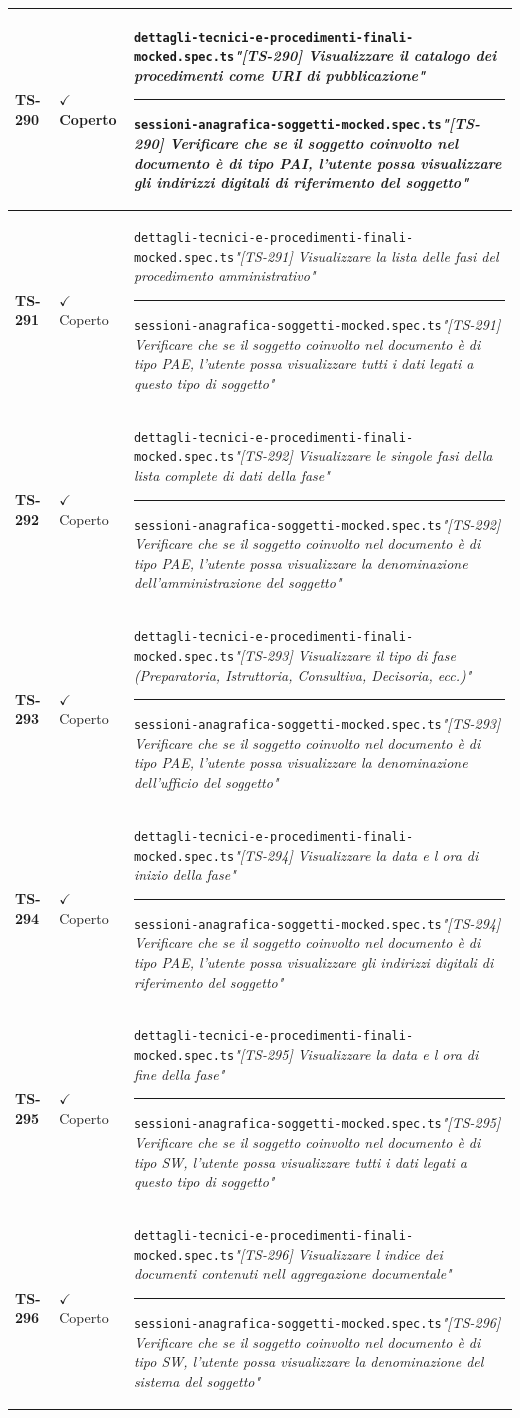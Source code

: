\documentclass[a4paper,12pt]{article}
\newcommand{\ok}{\textcolor{green!60!black}{$\checkmark$ Coperto}}
\newcommand{\f}[1]{\nolinkurl{#1}\newline}
\newcommand{\q}[1]{\textit{#1}}
\newcommand{\sep}{\newline \vspace{2mm} \hrule \vspace{2mm}}
\begin{document}
\begin{longtable}{|p{1.5cm}|p{3.0cm}|p{10.5cm}|}
\textbf{TS-290} & \ok & \f{dettagli-tecnici-e-procedimenti-finali-mocked.spec.ts}\q{"[TS-290] Visualizzare il catalogo dei procedimenti come URI di pubblicazione"} \sep \f{sessioni-anagrafica-soggetti-mocked.spec.ts}\q{"[TS-290] Verificare che se il soggetto coinvolto nel documento è di tipo PAI, l'utente possa visualizzare gli indirizzi digitali di riferimento del soggetto"} \\ \hline
\textbf{TS-291} & \ok & \f{dettagli-tecnici-e-procedimenti-finali-mocked.spec.ts}\q{"[TS-291] Visualizzare la lista delle fasi del procedimento amministrativo"} \sep \f{sessioni-anagrafica-soggetti-mocked.spec.ts}\q{"[TS-291] Verificare che se il soggetto coinvolto nel documento è di tipo PAE, l'utente possa visualizzare tutti i dati legati a questo tipo di soggetto"} \\ \hline
\textbf{TS-292} & \ok & \f{dettagli-tecnici-e-procedimenti-finali-mocked.spec.ts}\q{"[TS-292] Visualizzare le singole fasi della lista complete di dati della fase"} \sep \f{sessioni-anagrafica-soggetti-mocked.spec.ts}\q{"[TS-292] Verificare che se il soggetto coinvolto nel documento è di tipo PAE, l'utente possa visualizzare la denominazione dell'amministrazione del soggetto"} \\ \hline
\textbf{TS-293} & \ok & \f{dettagli-tecnici-e-procedimenti-finali-mocked.spec.ts}\q{"[TS-293] Visualizzare il tipo di fase (Preparatoria, Istruttoria, Consultiva, Decisoria, ecc.)"} \sep \f{sessioni-anagrafica-soggetti-mocked.spec.ts}\q{"[TS-293] Verificare che se il soggetto coinvolto nel documento è di tipo PAE, l'utente possa visualizzare la denominazione dell'ufficio del soggetto"} \\ \hline
\textbf{TS-294} & \ok & \f{dettagli-tecnici-e-procedimenti-finali-mocked.spec.ts}\q{"[TS-294] Visualizzare la data e l ora di inizio della fase"} \sep \f{sessioni-anagrafica-soggetti-mocked.spec.ts}\q{"[TS-294] Verificare che se il soggetto coinvolto nel documento è di tipo PAE, l'utente possa visualizzare gli indirizzi digitali di riferimento del soggetto"} \\ \hline
\textbf{TS-295} & \ok & \f{dettagli-tecnici-e-procedimenti-finali-mocked.spec.ts}\q{"[TS-295] Visualizzare la data e l ora di fine della fase"} \sep \f{sessioni-anagrafica-soggetti-mocked.spec.ts}\q{"[TS-295] Verificare che se il soggetto coinvolto nel documento è di tipo SW, l'utente possa visualizzare tutti i dati legati a questo tipo di soggetto"} \\ \hline
\textbf{TS-296} & \ok & \f{dettagli-tecnici-e-procedimenti-finali-mocked.spec.ts}\q{"[TS-296] Visualizzare l indice dei documenti contenuti nell aggregazione documentale"} \sep \f{sessioni-anagrafica-soggetti-mocked.spec.ts}\q{"[TS-296] Verificare che se il soggetto coinvolto nel documento è di tipo SW, l'utente possa visualizzare la denominazione del sistema del soggetto"} \\ \hline

\end{longtable}
\end{document}
